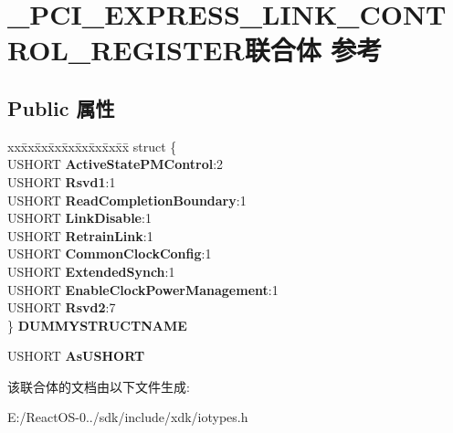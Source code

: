 \hypertarget{union___p_c_i___e_x_p_r_e_s_s___l_i_n_k___c_o_n_t_r_o_l___r_e_g_i_s_t_e_r}{}\section{\+\_\+\+P\+C\+I\+\_\+\+E\+X\+P\+R\+E\+S\+S\+\_\+\+L\+I\+N\+K\+\_\+\+C\+O\+N\+T\+R\+O\+L\+\_\+\+R\+E\+G\+I\+S\+T\+E\+R联合体 参考}
\label{union___p_c_i___e_x_p_r_e_s_s___l_i_n_k___c_o_n_t_r_o_l___r_e_g_i_s_t_e_r}
\subsection*{Public 属性}
\begin{DoxyCompactItemize}
\item 
\mbox{\label{union___p_c_i___e_x_p_r_e_s_s___l_i_n_k___c_o_n_t_r_o_l___r_e_g_i_s_t_e_r_a9b3e6d892a76967c27dbe3c11c267b74}} 
\begin{tabbing}
xx\=xx\=xx\=xx\=xx\=xx\=xx\=xx\=xx\=\kill
struct \{\\
\>USHORT {\bfseries ActiveStatePMControl}:2\\
\>USHORT {\bfseries Rsvd1}:1\\
\>USHORT {\bfseries ReadCompletionBoundary}:1\\
\>USHORT {\bfseries LinkDisable}:1\\
\>USHORT {\bfseries RetrainLink}:1\\
\>USHORT {\bfseries CommonClockConfig}:1\\
\>USHORT {\bfseries ExtendedSynch}:1\\
\>USHORT {\bfseries EnableClockPowerManagement}:1\\
\>USHORT {\bfseries Rsvd2}:7\\
\} {\bfseries DUMMYSTRUCTNAME}\\

\end{tabbing}\item 
\mbox{\label{union___p_c_i___e_x_p_r_e_s_s___l_i_n_k___c_o_n_t_r_o_l___r_e_g_i_s_t_e_r_afd5e4534f7cdd5a685c0b974f8e80311}} 
U\+S\+H\+O\+RT {\bfseries As\+U\+S\+H\+O\+RT}
\end{DoxyCompactItemize}


该联合体的文档由以下文件生成\+:\begin{DoxyCompactItemize}
\item 
E\+:/\+React\+O\+S-\/0../sdk/include/xdk/iotypes.\+h\end{DoxyCompactItemize}
